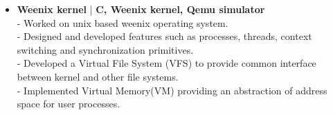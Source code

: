 \begin{itemize}
  \item \textbf{Weenix kernel} | \textbf{C, Weenix kernel, Qemu simulator}\\
 - Worked on unix based weenix operating system.\\
 - Designed and developed features such as processes, threads, context switching and synchronization primitives.\\
 - Developed a Virtual File System (VFS) to provide common interface between kernel and other file systems. \\
 - Implemented Virtual Memory(VM) providing an abstraction of address space for user processes.

\end{itemize}
\vspace{5pt}
